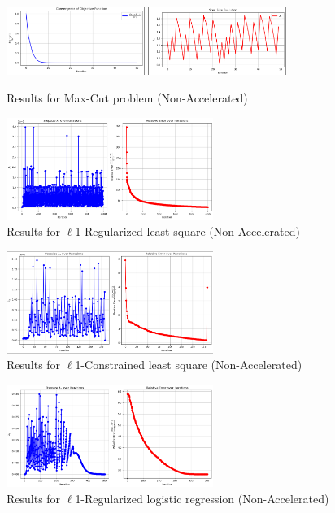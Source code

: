 \documentclass{article}
\begin{document}
\begin{figure}[htbp]
    \centering
    \includegraphics[width=0.4\textwidth]{41.png}
    \includegraphics[width=0.4\textwidth]{42.png}
    \caption{Results for  Max-Cut problem (Non-Accelerated)}
\end{figure}

\begin{figure}[htbp]
    \centering
    \includegraphics[width=0.6\textwidth]{5.png}
    \caption{Results for $\ell$1-Regularized least square (Non-Accelerated)}
\end{figure}


\begin{figure}[htbp]
    \centering
    \includegraphics[width=0.6\textwidth]{6.png}
    \caption{Results for $\ell$1-Constrained least square (Non-Accelerated)}
\end{figure}


\begin{figure}[htbp]
    \centering
    \includegraphics[width=0.6\textwidth]{7.png}
    \caption{Results for $\ell$1-Regularized logistic regression (Non-Accelerated)}
\end{figure}
\end{document}

